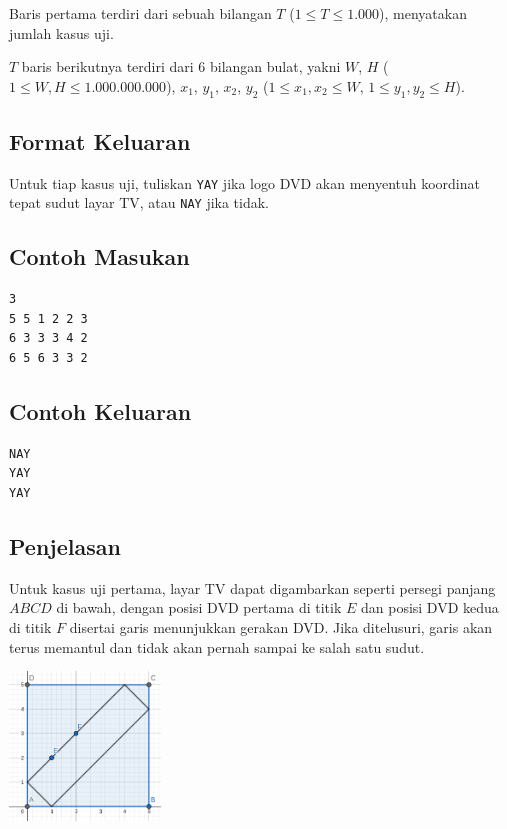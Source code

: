 \documentclass{article}
\begin{document}
Baris pertama terdiri dari sebuah bilangan $T$ ($1 \leq T \leq 1.000$), menyatakan jumlah kasus uji.

$T$ baris berikutnya terdiri dari 6 bilangan bulat, yakni $W$, $H$ ($1 \leq W, H \leq 1.000.000.000$), $x_1$, $y_1$, $x_2$, $y_2$ ($1 \leq x_1, x_2 \leq W$, $1 \leq y_1, y_2 \leq H$).

\subsection*{Format Keluaran}

Untuk tiap kasus uji, tuliskan \lstinline{YAY} jika logo DVD akan menyentuh koordinat tepat sudut layar TV, atau \lstinline{NAY} jika tidak.
\\

\begin{multicols}{2}
\subsection*{Contoh Masukan}
\begin{lstlisting}
3
5 5 1 2 2 3
6 3 3 3 4 2
6 5 6 3 3 2
\end{lstlisting}
\columnbreak
\subsection*{Contoh Keluaran}
\begin{lstlisting}
NAY
YAY
YAY
\end{lstlisting}
\vfill
\null
\end{multicols}

\subsection*{Penjelasan}
Untuk kasus uji pertama, layar TV dapat digambarkan seperti persegi panjang $ABCD$ di bawah, dengan posisi DVD pertama di titik $E$ dan posisi DVD kedua di titik $F$ disertai garis menunjukkan gerakan DVD. Jika ditelusuri, garis akan terus memantul dan tidak akan pernah sampai ke salah satu sudut.

\includegraphics[height=150px]{sample-1}
\end{document}
